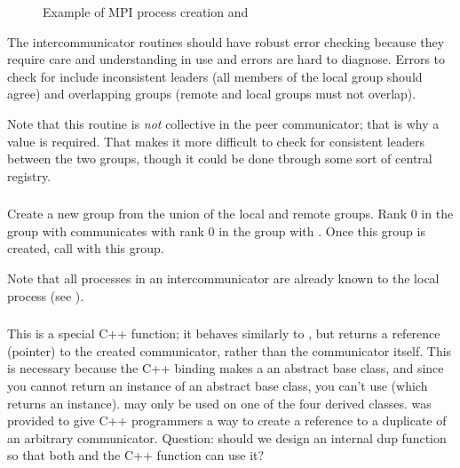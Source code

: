\documentclass{article}
\begin{document}
\begin{figure}
\centerline{}
\caption{Example of MPI process creation and
}\label{fig:spawn-ic} 
\end{figure}

The intercommunicator routines should have robust error checking because they
require care and understanding in use and errors are hard to diagnose.  
Errors to check for include inconsistent leaders (all members of the local
group should agree) and overlapping groups (remote and local groups
must not overlap).

Note that this routine is \emph{not} collective in the peer
communicator; that is why a  value is required.  That makes
it more difficult to check for consistent leaders between the two
groups, though it could be done tbrough some sort of central registry.
 
\subsubsection{}
Create a new group from the union of the local and remote groups.  Rank 0 in
the group with  communicates with rank 0 in the group with
.  Once this group is created, call
 with this group.  

Note that all processes in an intercommunicator are already known to the
local process (see ).

\subsubsection{}
This is a special C++ function; it behaves similarly to
, but returns a reference (pointer) to the created
communicator, rather than the communicator itself.  This is necessary because
the C++ binding makes a  an abstract base class, and since
you cannot return an instance of an abstract base class, you can't use
 (which returns an instance).  
may only be used on one of the four derived classes.
 was provided to give C++ programmers a way to
create a reference to a duplicate of an arbitrary communicator.
Question: should we design an internal dup function so that both
 and the C++  function can use it?
\end{document}

